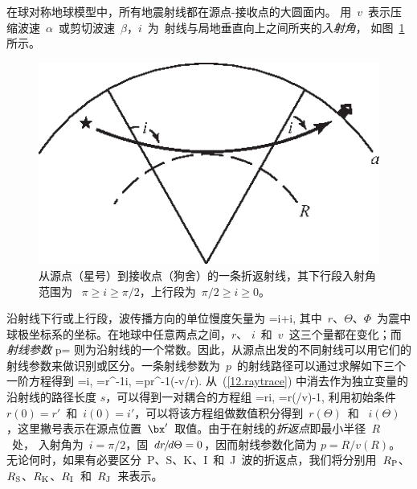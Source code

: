 在球对称地球模型中，所有地震射线都在源点-接收点的大圆面内。
用~$v$~表示压缩波速~$\alpha$~或剪切波速~$\beta$，$i$~为~射线与局地垂直向上之间所夹的{\em 入射角\/}，
%
如图~\ref{12.fig.ray}所示。
\begin{figure}[!b]
\begin{center}
\includegraphics{../figures/chap12/fig01.eps}
\end{center}
\caption[rayparameter]{\label{12.fig.ray}
从源点（星号）到接收点（狗舍）的一条折返射线，其下行段入射角范围为
~$\pi\geq i\geq\pi/2$，上行段为~$\pi/2\geq i\geq 0$。}
\end{figure}
沿射线下行或上行段，波传播方向的单位慢度矢量为
%
\eq
\bph=\brh\cos i+\bThetah\sin i,
\en
其中~$r$、$\Theta$、$\Phi$~为震中球极坐标系的坐标。在地球中任意两点之间，$r$、
$i$~和~$v$~这三个量都在变化；而{\em 射线参数\/}
%
\eq \label{12.pdef}
p=
\en
则为沿射线的一个常数。因此，从源点出发的不同射线可以用它们的射线参数来做识别或区分。一条射线参数为~$p$~的射线路径可以通过求解如下三个一阶方程得到
\eq \label{12.raytrace}
=\cos i,\qquad
{}=r^{-1}\sin i,\qquad
{}=pr^{-1}(-v/r).
\en
从~(\ref{12.raytrace}) 中消去作为独立变量的沿射线的路径长度
$s$，可以得到一对耦合的方程组
\eq \label{12.raytrace2}
=r\cot i,\qquad
{}=r(/v)-1,
\en
利用初始条件~$r(0)=r'$~和~$i(0)=i'$，可以将该方程组做数值积分得到~$r(\Theta)$~和 ~$i(\Theta)$，这里撇号表示在源点位置~$\bx'$~取值。由于在射线的{\em 折返点\/}即最小半径~$R$ ~处，
%
入射角为~$i=\pi/2$，固~$dr\hspace{-0.4 mm}/\hspace{-0.4 mm}d\Theta=0$，因而射线参数化简为 $p=R/v(R)$。无论何时，如果有必要区分~P、S、K、I~和~J~波的折返点，我们将分别用~$R_{\rm P}$、$R_{\rm S}$、$R_{\rm K}$、$R_{\rm I}$~和~$R_{\rm J}$~来表示。

